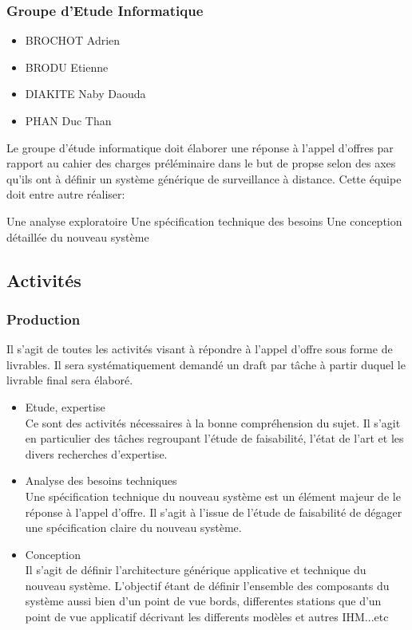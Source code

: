 \subsubsection{Groupe d'Etude Informatique}
\begin{itemize}
\item BROCHOT Adrien
\item BRODU Etienne
\item DIAKITE Naby Daouda 
\item PHAN Duc Than
\end{itemize}
Le groupe d'étude informatique doit élaborer une réponse à l'appel d'offres par rapport au cahier des charges préléminaire dans le but de propse
selon des axes qu'ils ont à définir un système générique de surveillance à distance. Cette équipe doit entre autre réaliser:

\subitem Une analyse exploratoire
\subitem Une spécification technique des besoins
\subitem Une conception détaillée du nouveau système

\subsection{Activités}
\subsubsection{Production}
Il s'agit de toutes les activités visant à répondre à l'appel d'offre sous forme de livrables. Il sera systématiquement demandé
un draft par tâche à partir duquel le livrable final sera élaboré.
\begin{itemize}
\item {Etude, expertise}\\
Ce sont des activités nécessaires à la bonne compréhension du sujet. Il s'agit en particulier des tâches regroupant l'étude de faisabilité, l'état 
de l'art et les divers recherches d'expertise.

\item {Analyse des besoins techniques}\\
Une spécification technique du nouveau système est un élément majeur de le réponse à l'appel d'offre. Il s'agit à l'issue de l'étude de faisabilité
de dégager une spécification claire du nouveau système.
\item {Conception}\\
Il s'agit de définir l'architecture générique applicative et technique du nouveau système. L'objectif étant de définir l'ensemble des composants
du système aussi bien d'un point de vue bords, differentes stations que d'un point de vue applicatif décrivant les differents modèles et autres IHM...etc
\end{itemize}
